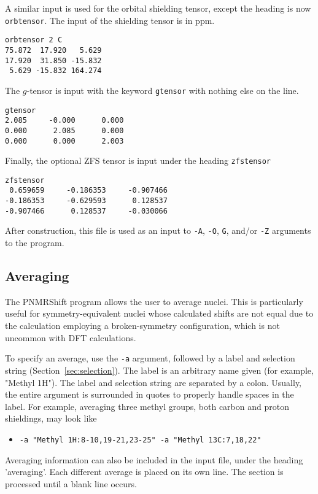 \documentclass[11pt]{report}
\newcommand\PNMRShift{\textsf{PNMRShift}\xspace}
\newcommand{\code}[1]{\lstinline!#1!}
\begin{document}
A similar input is used for the orbital shielding tensor,
except the heading is now \code{orbtensor}.
The input of the shielding tensor is in ppm.
%
\begin{lstlisting}[language={}]
orbtensor 2 C
75.872  17.920   5.629
17.920  31.850 -15.832
 5.629 -15.832 164.274
\end{lstlisting}

The $g$-tensor is input with the keyword \code{gtensor}
with nothing else on the line.
%
\begin{lstlisting}[language={}]
gtensor
2.085     -0.000      0.000
0.000      2.085      0.000
0.000      0.000      2.003
\end{lstlisting}

Finally, the optional ZFS tensor is input under the heading
\code{zfstensor}
%
\begin{lstlisting}[language={}]
zfstensor
 0.659659     -0.186353     -0.907466
-0.186353     -0.629593      0.128537
-0.907466      0.128537     -0.030066
\end{lstlisting}

After construction, this file is used
as an input to \code{-A}, \code{-O}, \code{G}, and/or
\code{-Z} arguments to the program.


\subsection{Averaging}
\label{sec:averaging}
The \PNMRShift program allows the user to average nuclei. This is particularly
useful for symmetry-equivalent nuclei whose calculated shifts are not equal
due to the calculation employing a broken-symmetry configuration,
which is not uncommon with DFT calculations.

To specify an average, use the \code{-a} argument, followed by a
label and selection string (Section~\ref{sec:selection}). The label
is an arbitrary name given (for example, "Methyl 1H"). The
label and selection string are separated by a colon. Usually, the
entire argument is surrounded in quotes to properly handle spaces
in the label. For example, averaging three methyl groups, both
carbon and proton shieldings, may look like
%
\begin{itemize}
\item[] \code{-a "Methyl 1H:8-10,19-21,23-25" -a "Methyl 13C:7,18,22"}
\end{itemize}
%
Averaging information can also be included in the input file, under the heading
'averaging'. Each different average is placed on its own line. The section
is processed until a blank line occurs.
\end{document}
